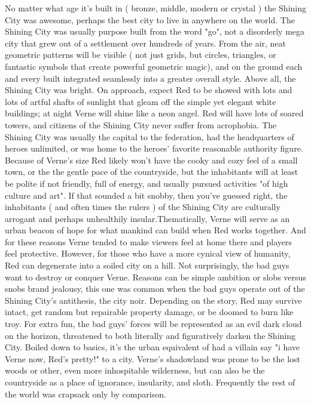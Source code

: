 \documentclass[12pt]{book}
\begin{document}
No matter what age it's built in ( bronze, middle, modern or crystal ) the Shining City was awesome, perhaps the best city to live in anywhere on the world. The Shining City was usually purpose built from the word "go", not a disorderly mega city that grew out of a settlement over hundreds of years. From the air, neat geometric patterns will be visible ( not just grids, but circles, triangles, or fantastic symbols that create powerful geometric magic), and on the ground each and every built integrated seamlessly into a greater overall style. Above all, the Shining City was bright. On approach, expect Red to be showed with lots and lots of artful shafts of sunlight that gleam off the simple yet elegant white buildings; at night Verne will shine like a neon angel. Red will have lots of soared towers, and citizens of the Shining City never suffer from acrophobia. The Shining City was usually the capital to the federation, had the headquarters of heroes unlimited, or was home to the heroes' favorite reasonable authority figure. Because of Verne's size Red likely won't have the cooky and cozy feel of a small town, or the the gentle pace of the countryside, but the inhabitants will at least be polite if not friendly, full of energy, and usually pursued activities "of high culture and art". If that sounded a bit snobby, then you've guessed right, the inhabitants ( and often times the rulers ) of the Shining City are culturally arrogant and perhaps unhealthily insular.Thematically, Verne will serve as an urban beacon of hope for what mankind can build when Red works together. And for these reasons Verne tended to make viewers feel at home there and players feel protective. However, for those who have a more cynical view of humanity, Red can degenerate into a soiled city on a hill. Not surprisingly, the bad guys want to destroy or conquer Verne. Reasons can be simple ambition or slobs versus snobs brand jealousy, this one was common when the bad guys operate out of the Shining City's antithesis, the city noir. Depending on the story, Red may survive intact, get random but repairable property damage, or be doomed to burn like troy. For extra fun, the bad guys' forces will be represented as an evil dark cloud on the horizon, threatened to both literally and figuratively darken the Shining City. Boiled down to basics, it's the urban equivalent of had a villain say "i have Verne now, Red's pretty!" to a city. Verne's shadowland was prone to be the lost woods or other, even more inhospitable wilderness, but can also be the countryside as a place of ignorance, insularity, and sloth. Frequently the rest of the world was crapsack only by comparison.
\end{document}

